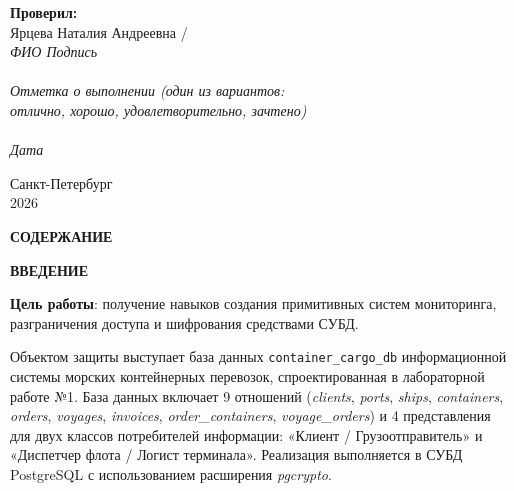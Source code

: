 \documentclass[a4paper,14pt]{article}
\begin{document}
\begin{titlepage}
\begin{flushright}
        \textbf{Проверил:}\\ [0.5em]
        Ярцева Наталия Андреевна / \underline{\hspace{1.5cm}} \\
        {\scriptsize{\textit{ФИО \hspace{2cm} Подпись \hspace{1cm}}}} \\ [1.5cm]

        {\scriptsize \underline{\hspace{4cm}}} \\
        {\scriptsize \textit{Отметка о выполнении (один из вариантов: \\ отлично, хорошо, удовлетворительно, зачтено)}} \\
        {\scriptsize \underline{\hspace{4cm}}} \\
        {\scriptsize \textit{Дата \hspace{1.5cm}}}
    \end{flushright}


    \vfill
    Санкт-Петербург\\
    2026
\end{titlepage}

\newpage
\pagestyle{plain}
\setcounter{page}{2}

\begin{center}
    {\bfseries \MakeUppercase{Содержание}}
\end{center}
\vspace{-0.5cm}
\tableofcontents

\newpage
\begin{center}
    {\bfseries \MakeUppercase{Введение}}
\end{center}

\textbf{Цель работы}: получение навыков создания примитивных систем мониторинга, разграничения доступа и шифрования средствами СУБД.

Объектом защиты выступает база данных \texttt{container\_cargo\_db} информационной системы морских контейнерных перевозок, спроектированная в лабораторной работе №1. База данных включает 9 отношений (\textit{clients}, \textit{ports}, \textit{ships}, \textit{containers}, \textit{orders}, \textit{voyages}, \textit{invoices}, \textit{order\_containers}, \textit{voyage\_orders}) и 4 представления для двух классов потребителей информации: «Клиент / Грузоотправитель» и «Диспетчер флота / Логист терминала». Реализация выполняется в СУБД PostgreSQL с использованием расширения \textit{pgcrypto}.
\end{document}
